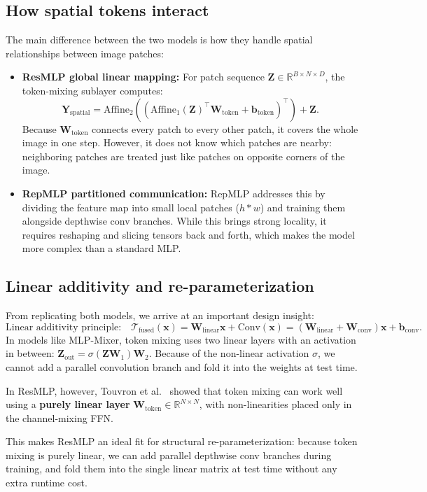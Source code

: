 \subsection{How spatial tokens interact}
The main difference between the two models is how they handle spatial relationships between image patches:
\begin{itemize}[leftmargin=1.5em]
    \item \textbf{ResMLP global linear mapping:} For patch sequence $\mathbf{Z} \in \mathbb{R}^{B \times N \times D}$, the token-mixing sublayer computes:
    \begin{equation}
        \mathbf{Y}_{\text{spatial}} = \text{Affine}_2 \left( \left( \text{Affine}_1(\mathbf{Z})^{\top} \mathbf{W}_{\text{token}} + \bm{b}_{\text{token}} \right)^{\top} \right) + \mathbf{Z}.
    \end{equation}
    Because $\mathbf{W}_{\text{token}}$ connects every patch to every other patch, it covers the whole image in one step. However, it does not know which patches are nearby: neighboring patches are treated just like patches on opposite corners of the image.
    
    \item \textbf{RepMLP partitioned communication:} RepMLP addresses this by dividing the feature map into small local patches ($h * w$) and training them alongside depthwise conv branches. While this brings strong locality, it requires reshaping and slicing tensors back and forth, which makes the model more complex than a standard MLP.
\end{itemize}

\subsection{Linear additivity and re-parameterization}
From replicating both models, we arrive at an important design insight:
\begin{equation}
    \text{Linear additivity principle:} \quad \mathcal{T}_{\text{fused}}(\mathbf{x}) = \mathbf{W}_{\text{linear}} \mathbf{x} + \text{Conv}(\mathbf{x}) = \left(\mathbf{W}_{\text{linear}} + \mathbf{W}_{\text{conv}}\right) \mathbf{x} + \bm{b}_{\text{conv}}.
\end{equation}
In models like MLP-Mixer, token mixing uses two linear layers with an activation in between: $\mathbf{Z}_{\text{out}} = \sigma(\mathbf{Z} \mathbf{W}_1) \mathbf{W}_2$. Because of the non-linear activation $\sigma$, we cannot add a parallel convolution branch and fold it into the weights at test time.

In ResMLP, however, Touvron et al.~\cite{touvron2021resmlp} showed that token mixing can work well using a \textbf{purely linear layer} $\mathbf{W}_{\text{token}} \in \mathbb{R}^{N \times N}$, with non-linearities placed only in the channel-mixing FFN. 

This makes ResMLP an ideal fit for structural re-parameterization: because token mixing is purely linear, we can add parallel depthwise conv branches during training, and fold them into the single linear matrix at test time without any extra runtime cost.
